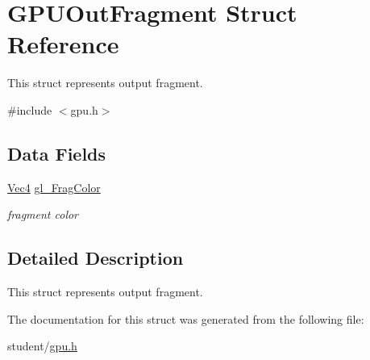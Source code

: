 \hypertarget{structGPUOutFragment}{}\section{G\+P\+U\+Out\+Fragment Struct Reference}
\label{structGPUOutFragment}


This struct represents output fragment.  




{\ttfamily \#include $<$gpu.\+h$>$}

\subsection*{Data Fields}
\begin{DoxyCompactItemize}
\item 
\mbox{\label{structGPUOutFragment_a24a04d2f58ab7538fc15567808f90ddd}} 
\hyperlink{structVec4}{Vec4} \hyperlink{structGPUOutFragment_a24a04d2f58ab7538fc15567808f90ddd}{gl\+\_\+\+Frag\+Color}
\begin{DoxyCompactList}\small\item\em fragment color \end{DoxyCompactList}\end{DoxyCompactItemize}


\subsection{Detailed Description}
This struct represents output fragment. 

The documentation for this struct was generated from the following file\+:\begin{DoxyCompactItemize}
\item 
student/\hyperlink{gpu_8h}{gpu.\+h}\end{DoxyCompactItemize}
